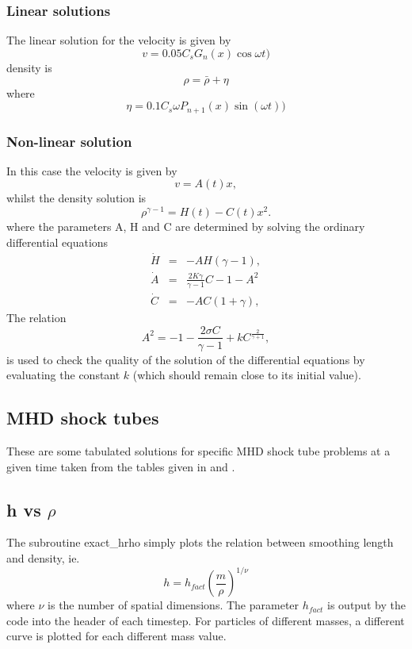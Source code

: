 \documentclass[a4paper,11pt]{article}
\begin{document}
\subsubsection{ Linear solutions}
The linear solution for the velocity is given by
\begin{equation}
v = 0.05 C_s G_n(x) \cos{\omega t} )
\end{equation}
density is
\begin{equation}
\rho = \bar{\rho} + \eta
\end{equation}
where 
\begin{equation}
\eta = 0.1 C_s \omega P_{n+1}(x) \sin{(\omega t)})
\end{equation}

\subsubsection{ Non-linear solution}
In this case the velocity is given by
\begin{equation}
v = A(t) x,
\end{equation}
whilst the density solution is
\begin{equation}
\rho^{\gamma -1} = H(t) - C(t) x^2.
\end{equation}
where the parameters A, H and C are determined by solving the ordinary
differential equations
\begin{eqnarray}
\dot{H} & = & -AH(\gamma -1), \\
\dot{A} & = & \frac{2K \gamma}{\gamma -1} C - 1 - A^2 \\
\dot{C} & = & -AC(1+ \gamma),
\end{eqnarray}
The relation
\begin{equation}
A^2 = -1 - \frac{2 \sigma C}{\gamma -1} + kC^{\frac{2}{\gamma +1}},
\label{eq:kconst}
\end{equation}
is used to check the quality of the solution of the differential equations by
evaluating the constant $k$ (which should remain close to its initial value).

\subsection{MHD shock tubes}
 These are some tabulated solutions for specific MHD shock tube problems at a
given time taken from the tables given in \citet{dw94} and \citet{rj95}.

\subsection{h vs $\rho$}
 The subroutine exact\_hrho simply plots the relation between smoothing length
and density, ie.
\begin{equation}
h = h_{fact} \left(\frac{m}{\rho}\right)^{1/\nu}
\end{equation}
where $\nu$ is the number of spatial dimensions. The parameter $h_{fact}$ is
output by the code into the header of each timestep. For particles of different
masses, a different curve is plotted for each different mass value.
\end{document}
